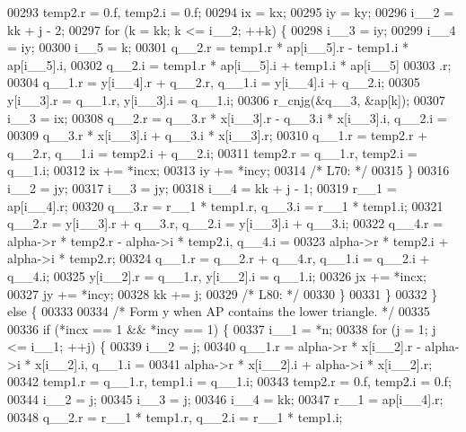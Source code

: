 \begin{DoxyCode}
00293         temp2.r = 0.f, temp2.i = 0.f;
00294         ix = kx;
00295         iy = ky;
00296         i\_\_2 = kk + j - 2;
00297         \textcolor{keywordflow}{for} (k = kk; k <= i\_\_2; ++k) \{
00298             i\_\_3 = iy;
00299             i\_\_4 = iy;
00300             i\_\_5 = k;
00301             q\_\_2.r = temp1.r * ap[i\_\_5].r - temp1.i * ap[i\_\_5].i, 
00302                 q\_\_2.i = temp1.r * ap[i\_\_5].i + temp1.i * ap[i\_\_5]
00303                 .r;
00304             q\_\_1.r = y[i\_\_4].r + q\_\_2.r, q\_\_1.i = y[i\_\_4].i + q\_\_2.i;
00305             y[i\_\_3].r = q\_\_1.r, y[i\_\_3].i = q\_\_1.i;
00306             r\_cnjg(&q\_\_3, &ap[k]);
00307             i\_\_3 = ix;
00308             q\_\_2.r = q\_\_3.r * x[i\_\_3].r - q\_\_3.i * x[i\_\_3].i, q\_\_2.i =
00309                  q\_\_3.r * x[i\_\_3].i + q\_\_3.i * x[i\_\_3].r;
00310             q\_\_1.r = temp2.r + q\_\_2.r, q\_\_1.i = temp2.i + q\_\_2.i;
00311             temp2.r = q\_\_1.r, temp2.i = q\_\_1.i;
00312             ix += *incx;
00313             iy += *incy;
00314 \textcolor{comment}{/* L70: */}
00315         \}
00316         i\_\_2 = jy;
00317         i\_\_3 = jy;
00318         i\_\_4 = kk + j - 1;
00319         r\_\_1 = ap[i\_\_4].r;
00320         q\_\_3.r = r\_\_1 * temp1.r, q\_\_3.i = r\_\_1 * temp1.i;
00321         q\_\_2.r = y[i\_\_3].r + q\_\_3.r, q\_\_2.i = y[i\_\_3].i + q\_\_3.i;
00322         q\_\_4.r = alpha->r * temp2.r - alpha->i * temp2.i, q\_\_4.i = 
00323             alpha->r * temp2.i + alpha->i * temp2.r;
00324         q\_\_1.r = q\_\_2.r + q\_\_4.r, q\_\_1.i = q\_\_2.i + q\_\_4.i;
00325         y[i\_\_2].r = q\_\_1.r, y[i\_\_2].i = q\_\_1.i;
00326         jx += *incx;
00327         jy += *incy;
00328         kk += j;
00329 \textcolor{comment}{/* L80: */}
00330         \}
00331     \}
00332     \} \textcolor{keywordflow}{else} \{
00333 
00334 \textcolor{comment}{/*        Form  y  when AP contains the lower triangle. */}
00335 
00336     \textcolor{keywordflow}{if} (*incx == 1 && *incy == 1) \{
00337         i\_\_1 = *n;
00338         \textcolor{keywordflow}{for} (j = 1; j <= i\_\_1; ++j) \{
00339         i\_\_2 = j;
00340         q\_\_1.r = alpha->r * x[i\_\_2].r - alpha->i * x[i\_\_2].i, q\_\_1.i =
00341              alpha->r * x[i\_\_2].i + alpha->i * x[i\_\_2].r;
00342         temp1.r = q\_\_1.r, temp1.i = q\_\_1.i;
00343         temp2.r = 0.f, temp2.i = 0.f;
00344         i\_\_2 = j;
00345         i\_\_3 = j;
00346         i\_\_4 = kk;
00347         r\_\_1 = ap[i\_\_4].r;
00348         q\_\_2.r = r\_\_1 * temp1.r, q\_\_2.i = r\_\_1 * temp1.i;

\end{DoxyCode}
